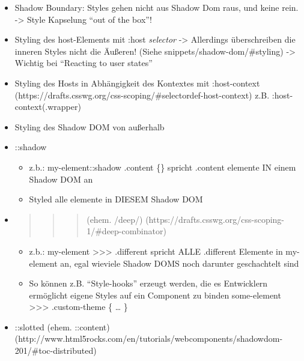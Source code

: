 \begin{itemize}
\item
  Shadow Boundary: Styles gehen nicht aus Shadow Dom raus, und keine
  rein. -\textgreater{} Style Kapselung ``out of the box''!
\item
  Styling des host-Elements mit :host \emph{selector} -\textgreater{}
  Allerdings überschreiben die inneren Styles nicht die Äußeren! (Siehe
  snippets/shadow-dom/\#styling) -\textgreater{} Wichtig bei ``Reacting
  to user states''
\item
  Styling des Hosts in Abhängigkeit des Kontextes mit :host-context
  (https://drafts.csswg.org/css-scoping/\#selectordef-host-context) z.B.
  :host-context(.wrapper)
\item
  Styling des Shadow DOM von außerhalb
\item
  ::shadow

  \begin{itemize}
  \tightlist
  \item
    z.b.: my-element::shadow .content \{\} spricht .content elemente IN
    einem Shadow DOM an
  \item
    Styled alle elemente in DIESEM Shadow DOM
  \end{itemize}
\item
  \begin{quote}
  \begin{quote}
  \begin{quote}
  (ehem. /deep/)
  (https://drafts.csswg.org/css-scoping-1/\#deep-combinator)
  \end{quote}
  \end{quote}
  \end{quote}

  \begin{itemize}
  \tightlist
  \item
    z.b.: my-element \textgreater{}\textgreater{}\textgreater{}
    .different spricht ALLE .different Elemente in my-element an, egal
    wieviele Shadow DOMS noch darunter geschachtelt sind
  \item
    So können z.B. ``Style-hooks'' erzeugt werden, die es Entwicklern
    ermöglicht eigene Styles auf ein Component zu binden some-element
    \textgreater{}\textgreater{}\textgreater{} .custom-theme \{ \ldots{}
    \}
  \end{itemize}
\item
  ::slotted (ehem. ::content)
  (http://www.html5rocks.com/en/tutorials/webcomponents/shadowdom-201/\#toc-distributed)


\end{itemize}
